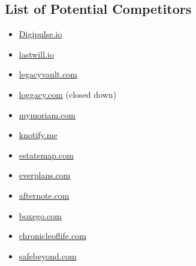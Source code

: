 \appendix
\begin{appendices} %
\chapter{List of Potential Competitors} %
\label{cha:list_of_potential_competitors}

\begin{itemize}
	\item \url{Digipulse.io}
	\item \url{lastwill.io}
	\item \url{legacyvault.com}
	\item \url{loggacy.com} (closed down)
	\item \url{mymoriam.com}
	\item \url{knotify.me}
	\item \url{estatemap.com}
	\item \url{everplans.com}
	\item \url{afternote.com}
	\item \url{boxego.com}
	\item \url{chronicleoflife.com}
	\item \url{safebeyond.com}
\end{itemize}


\end{appendices}

